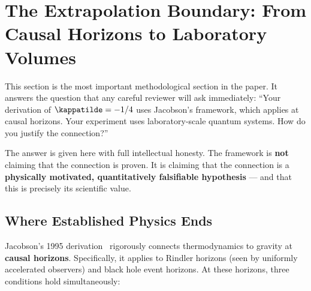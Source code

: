 %

\section{The Extrapolation Boundary: From Causal Horizons to Laboratory
Volumes}
\label{sec:extrapolation}

This section is the most important methodological section in the paper.
It answers the question that any careful reviewer will ask immediately:
``Your derivation of $\kappatilde = -1/4$ uses Jacobson's framework, which
applies at causal horizons. Your experiment uses laboratory-scale quantum
systems. How do you justify the connection?''

The answer is given here with full intellectual honesty. The framework is
\textbf{not} claiming that the connection is proven. It is claiming that the
connection is a \textbf{physically motivated, quantitatively falsifiable
hypothesis} --- and that this is precisely its scientific value.

\subsection{Where Established Physics Ends}
\label{subsec:where_ends}

Jacobson's 1995 derivation~\cite{jacobson1995} rigorously connects
thermodynamics to gravity at \textbf{causal horizons}. Specifically,
it applies to Rindler horizons (seen by uniformly accelerated observers)
and black hole event horizons. At these horizons, three conditions hold
simultaneously:

